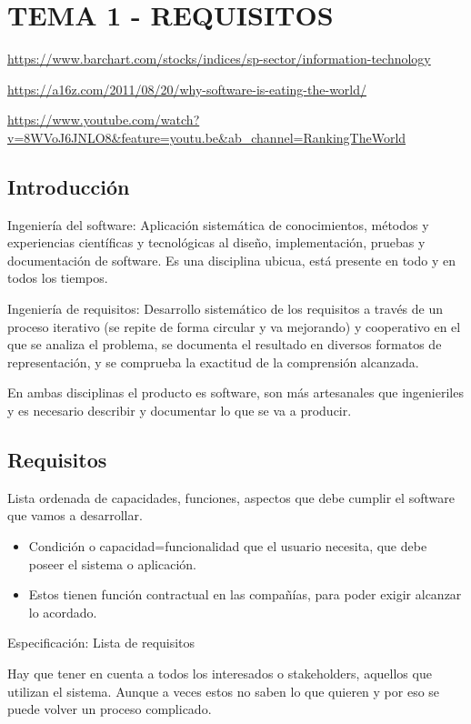 \documentclass[12pt, twoside, openright]{report} %
\begin{document}
\chapter{TEMA 1 - REQUISITOS}

  \url{https://www.barchart.com/stocks/indices/sp-sector/information-technology}

  \url{https://a16z.com/2011/08/20/why-software-is-eating-the-world/}

  \url{https://www.youtube.com/watch?v=8WVoJ6JNLO8\&feature=youtu.be\&ab_channel=RankingTheWorld}

\section{Introducción}

Ingeniería del software: Aplicación sistemática de conocimientos,
métodos y experiencias científicas y tecnológicas al diseño,
implementación, pruebas y documentación de software. Es una
disciplina ubicua, está presente en todo y en todos los tiempos.

Ingeniería de requisitos: Desarrollo sistemático de los requisitos a
través de un proceso iterativo (se repite de forma circular y va
mejorando) y cooperativo en el que se analiza el problema, se
documenta el resultado en diversos formatos de representación, y se
comprueba la exactitud de la comprensión alcanzada.

En ambas disciplinas el producto es software, son más artesanales
que ingenieriles y es necesario describir y documentar lo que se va
a producir.

	
\section{Requisitos}

Lista ordenada de capacidades, funciones, aspectos que debe cumplir el
software que vamos a desarrollar.

\begin{itemize}
  \item
    Condición o capacidad=funcionalidad que el usuario necesita, que
    debe poseer el sistema o aplicación.
  \item
    Estos tienen función contractual en las compañías, para poder exigir
    alcanzar lo acordado.
\end{itemize}
Especificación: Lista de requisitos

Hay que tener en cuenta a todos los interesados o stakeholders,
aquellos que utilizan el sistema. Aunque a veces estos no saben lo
que quieren y por eso se puede volver un proceso complicado.
\pagebreak
\end{document}
